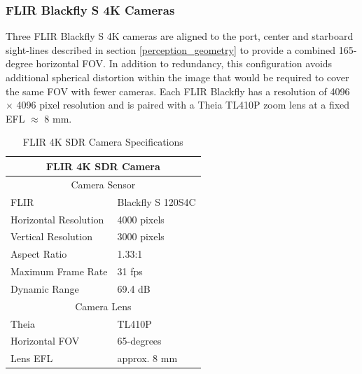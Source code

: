\documentclass{erauthesis}
\begin{document}
\subsubsection{FLIR Blackfly S 4K Cameras} \label{sensors_FLIR}

Three FLIR Blackfly S 4K cameras are aligned to the port, center and starboard sight-lines described in section \ref{perception_geometry} to provide a combined 165-degree horizontal \ac{FOV}.
In addition to redundancy, this configuration avoids additional spherical distortion within the image that would be required to cover the same \ac{FOV} with fewer cameras.
Each FLIR Blackfly has a resolution of 4096 $\times$ 4096 pixel resolution and is paired with a Theia TL410P zoom lens at a fixed \ac{EFL} $\approx$ 8 mm.


\begin{table}[htbp]
\centering
\caption{FLIR 4K SDR Camera Specifications}
\begin{tabular}{ll}
\hline
\multicolumn{2}{c}{FLIR 4K SDR Camera}\\
\hline
\hline
\multicolumn{2}{c}{Camera Sensor}\\
\hline
FLIR & Blackfly S 120S4C \\
Horizontal Resolution & 4000 pixels \\
Vertical Resolution & 3000 pixels \\
Aspect Ratio & 1.33:1 \\
Maximum Frame Rate & 31 fps \\
Dynamic Range & 69.4 dB \\
\multicolumn{2}{c}{Camera Lens}\\
\hline
Theia & TL410P\\
Horizontal \Ac{FOV} & 65-degrees\\
Lens \Ac{EFL} & approx. 8 mm\\
\hline
\end{tabular}
\label{table:SDR_camera_specs}
\end{table}
\end{document}
